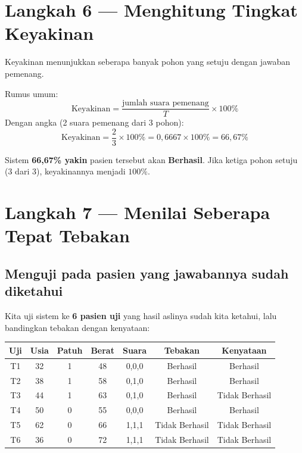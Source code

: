 \documentclass[11pt,a4paper]{article}
\begin{document}
\section{Langkah 6 --- Menghitung Tingkat Keyakinan}

Keyakinan menunjukkan seberapa banyak pohon yang setuju dengan jawaban pemenang.

\begin{rumus}
Rumus umum:
\[ \text{Keyakinan} = \frac{\text{jumlah suara pemenang}}{T} \times 100\% \]
Dengan angka (2 suara pemenang dari 3 pohon):
\[ \text{Keyakinan} = \frac{2}{3} \times 100\% = 0{,}6667 \times 100\% = 66{,}67\% \]
\end{rumus}

\begin{hasil}
Sistem \textbf{66{,}67\% yakin} pasien tersebut akan \textbf{Berhasil}. Jika ketiga pohon
setuju (3 dari 3), keyakinannya menjadi $100\%$.
\end{hasil}

\section{Langkah 7 --- Menilai Seberapa Tepat Tebakan}

\subsection{Menguji pada pasien yang jawabannya sudah diketahui}

Kita uji sistem ke \textbf{6 pasien uji} yang hasil aslinya sudah kita ketahui, lalu bandingkan
tebakan dengan kenyataan:

\begin{center}
\begin{tabular}{ccccccc}
\toprule
\textbf{Uji} & \textbf{Usia} & \textbf{Patuh} & \textbf{Berat} & \textbf{Suara} & \textbf{Tebakan} & \textbf{Kenyataan} \\
\midrule
T1 & 32 & 1 & 48 & 0,0,0 & Berhasil & Berhasil \\
T2 & 38 & 1 & 58 & 0,1,0 & Berhasil & Berhasil \\
T3 & 44 & 1 & 63 & 0,1,0 & Berhasil & \textcolor{merah}{Tidak Berhasil} \\
T4 & 50 & 0 & 55 & 0,0,0 & Berhasil & Berhasil \\
T5 & 62 & 0 & 66 & 1,1,1 & Tidak Berhasil & Tidak Berhasil \\
T6 & 36 & 0 & 72 & 1,1,1 & Tidak Berhasil & Tidak Berhasil \\
\bottomrule
\end{tabular}
\end{center}
\end{document}
